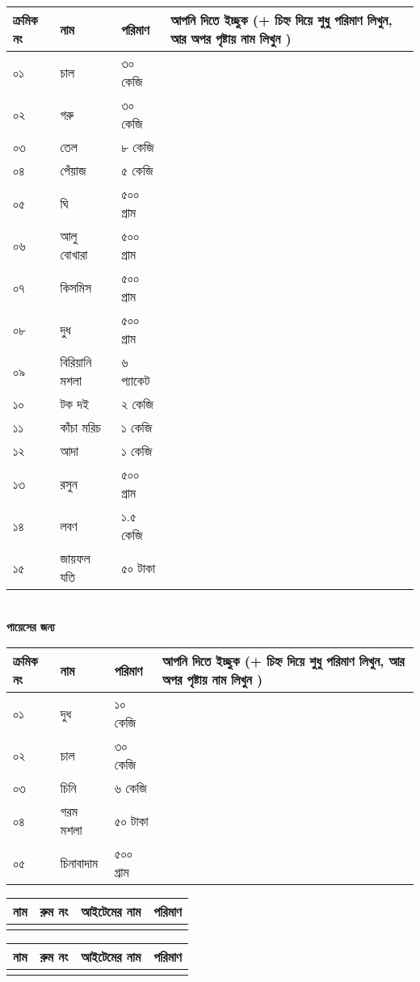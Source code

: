 \documentclass{article}
\newcommand{\aline}{\\\hline \arabic{theyflines} &&&\rule{0cm}{1cm}}
\begin{document}
\begin{center}
\end{center}
\noindent
\begin{tabular}{@{}lll|p{15cm}}
\toprule
ক্রমিক নং &  নাম &  পরিমাণ & আপনি দিতে ইচ্ছুক (+ চিহ্ন দিয়ে শুধু পরিমাণ লিখুন, আর অপর পৃষ্টায় নাম লিখুন )\\
\toprule
০১ & চাল & ৩০ কেজি &\\
\hline
০২ & গরু & ৩০ কেজি &\\
\hline
০৩ & তেল & ৮ কেজি &\\
\hline
০৪ & পেঁয়াজ & ৫ কেজি &\\
\hline
০৫ & ঘি & ৫০০ গ্রাম &\\
\hline
০৬ & আলু বোখারা & ৫০০ গ্রাম &\\
\hline
০৭ & কিসমিস & ৫০০ গ্রাম &\\
\hline
০৮ & দুধ & ৫০০ গ্রাম &\\
\hline
০৯ & বিরিয়ানি মশলা & ৬ প্যাকেট &\\
\hline
১০ & টক দই & ২ কেজি &\\
\hline
১১ & কাঁচা মরিচ & ১ কেজি &\\
\hline
১২ & আদা & ১ কেজি &\\
\hline
১৩ & রসুন & ৫০০ গ্রাম &\\
\hline
১৪ & লবণ & ১.৫ কেজি &\\
\hline
১৫ & জায়ফল যতি & ৫০ টাকা &\\
\bottomrule
\end{tabular}
\\

\textbf{পায়েসের জন্য}\\
\noindent
\begin{tabular}{@{}lll|p{15cm}}
\toprule
ক্রমিক নং &  নাম &  পরিমাণ & আপনি দিতে ইচ্ছুক (+ চিহ্ন দিয়ে শুধু পরিমাণ লিখুন, আর অপর পৃষ্টায় নাম লিখুন )\\
\toprule
০১ & দুধ & ১০ কেজি & \\
\hline
০২ & চাল & ৩০ কেজি & \\
\hline
০৩ & চিনি & ৬ কেজি & \\
\hline
০৪ & গরম মশলা & ৫০ টাকা & \\
\hline
০৫ & চিনাবাদাম & ৫০০ গ্রাম & \\
\bottomrule
\end{tabular}
\newpage
\begin{tabular}{|p{6cm}|p{3cm}|p{5cm}|p{4cm}|}
\toprule
নাম & রুম নং & আইটেমের নাম & পরিমাণ
\forloop{theyflines}{1}{\value{theyflines} < 26}{\aline}\\
\toprule
\end{tabular}
\newpage
\begin{tabular}{|p{6cm}|p{3cm}|p{5cm}|p{4cm}|}
\toprule
নাম & রুম নং & আইটেমের নাম & পরিমাণ
\forloop{theyflines}{1}{\value{theyflines} < 26}{\aline}\\
\toprule
\end{tabular}
\end{document}
